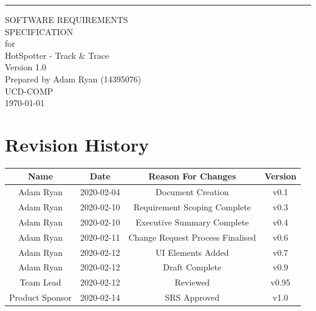 \documentclass{scrreprt}
\date{}
\def\myversion{1.0 }
\begin{document}
\begin{flushright}
    \rule{16cm}{5pt}\vskip1cm
    \begin{bfseries}
        \Huge{SOFTWARE REQUIREMENTS\\ SPECIFICATION}\\
        \vspace{1.9cm}
        for\\
        \vspace{1.9cm}
        HotSpotter - Track \& Trace\\
        \vspace{1.9cm}
        \LARGE{Version \myversion}\\
        \vspace{1.9cm}
        Prepared by Adam Ryan (14395076)\\
        \vspace{1.9cm}
        UCD-COMP\\
        \vspace{1.9cm}
        \today\\
    \end{bfseries}
\end{flushright}

\tableofcontents


\chapter*{Revision History}\label{RevisionHistory}

\begin{center}
    \begin{tabular}{|c|c|c|c|}
        \hline
	    Name & Date & Reason For Changes & Version\\
        \hline
	    Adam Ryan & 2020-02-04 & Document Creation & v0.1\\
        \hline
	     Adam Ryan & 2020-02-10 & Requirement Scoping Complete & v0.3\\
        \hline
        Adam Ryan & 2020-02-10 & Executive Summary Complete & v0.4\\
        \hline
         Adam Ryan & 2020-02-11 & Change Request Process Finalised & v0.6\\
        \hline
        Adam Ryan & 2020-02-12 & UI Elements Added & v0.7\\
        \hline
        Adam Ryan & 2020-02-12 & Draft Complete & v0.9\\
        \hline
        Team Lead & 2020-02-12 & Reviewed & v0.95\\
\hline
        Product Sponsor & 2020-02-14 & SRS Approved & v1.0\\
        \hline
    \end{tabular}
\end{center}
\end{document}
